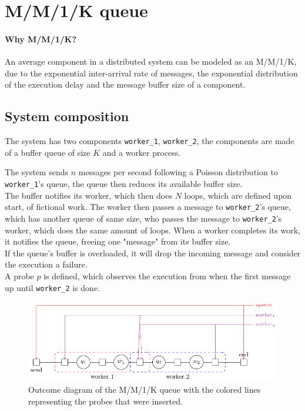 \section{M/M/1/K queue}
    \paragraph{Why M/M/1/K?} An average component in a distributed system can be modeled as an M/M/1/K, due to the exponential inter-arrival rate of messages, the exponential distribution of the execution delay and the message buffer size of a component.
    
    \subsection{System composition}
    The system has two components \texttt{worker\_1}, \texttt{worker\_2}, the components are made of a buffer queue of size $K$ and a worker process.
    
    The system sends $n$ messages per second following a Poisson distribution to \texttt{worker\_1}'s queue, the queue then reduces its available buffer size. \\
    
    The buffer notifies its worker, which then does $N$ loops, which are defined upon start, of fictional work. The worker then passes a message to \texttt{worker\_2}'s queue, which has another queue of same size, who passes the message to \texttt{worker\_2}'s worker, which does the same amount of loops. When a worker completes its work, it notifies the queue, freeing one "message" from its buffer size. \\
    
    If the queue's buffer is overloaded, it will drop the incoming message and consider the execution a failure. \\
    
    A probe $p$ is defined, which observes the execution from when the first message up until \texttt{worker\_2} is done.
    \begin{figure}[H]
        \begin{center}
            \includegraphics[scale=1.2, width=\textwidth]{tikz/mm1k.pdf} 
        \end{center}
        \caption{Outcome diagram of the M/M/1/K queue with the colored lines representing the probes that were inserted.}
        \label{fig:mm1k}
    \end{figure}

